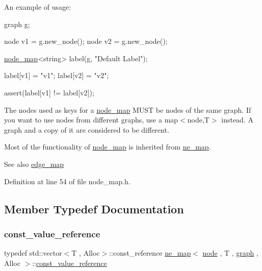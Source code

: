 An example of usage\+: 
\begin{DoxyPre}
  graph g;\end{DoxyPre}



\begin{DoxyPre}  node v1 = g.new\_node();
  node v2 = g.new\_node();\end{DoxyPre}



\begin{DoxyPre}  \mbox{\hyperlink{classnode__map}{node\_map}}<string> label(g, "Default Label");\end{DoxyPre}



\begin{DoxyPre}  label[v1] = "v1";
  label[v2] = "v2";\end{DoxyPre}



\begin{DoxyPre}  assert(label[v1] != label[v2]);
\end{DoxyPre}


The nodes used as keys for a {\ttfamily \mbox{\hyperlink{classnode__map}{node\+\_\+map}}} M\+U\+ST be nodes of the same graph. If you want to use nodes from different graphs, use a {\ttfamily map$<$node,T$>$} instead. A graph and a copy of it are considered to be different.

Most of the functionality of {\ttfamily \mbox{\hyperlink{classnode__map}{node\+\_\+map}}} is inherited from \mbox{\hyperlink{classne__map}{ne\+\_\+map}}.

\begin{DoxySeeAlso}{See also}
\mbox{\hyperlink{classedge__map}{edge\+\_\+map}} 
\end{DoxySeeAlso}


Definition at line 54 of file node\+\_\+map.\+h.



\subsection{Member Typedef Documentation}
\mbox{\label{classne__map_ad2be1a01de53940aee1282ec0e34f0f7}} 
\subsubsection{\texorpdfstring{const\+\_\+value\+\_\+reference}{const\_value\_reference}}
{\footnotesize\ttfamily typedef std\+::vector$<$T , Alloc$>$\+::const\+\_\+reference \mbox{\hyperlink{classne__map}{ne\+\_\+map}}$<$ \mbox{\hyperlink{classnode}{node}} , T , \mbox{\hyperlink{classgraph}{graph}} , Alloc $>$\+::\mbox{\hyperlink{classne__map_ad2be1a01de53940aee1282ec0e34f0f7}{const\+\_\+value\+\_\+reference}}\hspace{0.3cm}{\ttfamily [inherited]}}




